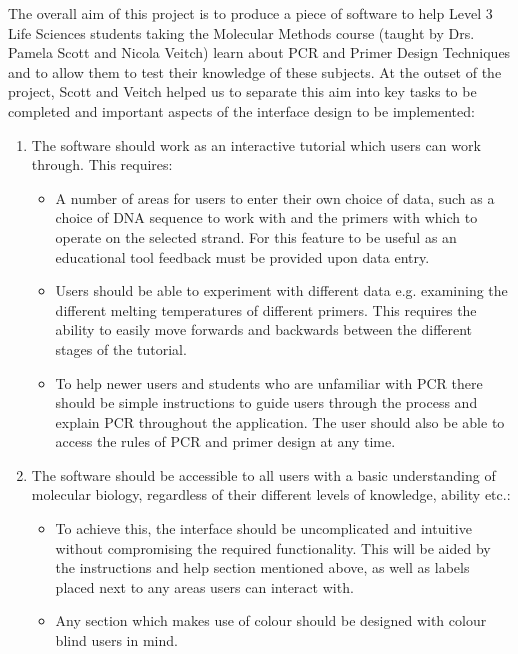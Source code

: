 The overall aim of this project is to produce a piece of software to
help Level 3 Life Sciences students taking the Molecular Methods
course (taught by Drs. Pamela Scott and Nicola Veitch) learn about PCR
and Primer Design Techniques and to allow them to test their knowledge
of these subjects. At the outset of the project, Scott and Veitch
helped us to separate this aim into key tasks to be completed and
important aspects of the interface design to be implemented:

\begin {enumerate}

\item The software should work as an interactive tutorial which users
  can work through. This requires:

\begin {itemize}
\item A number of areas for users to enter their own choice of data,
  such as a choice of DNA sequence to work with and the primers with
  which to operate on the selected strand. For this feature to be
  useful as an educational tool feedback must be provided upon data
  entry.
\item Users should be able to experiment with different data
  e.g. examining the different melting temperatures of different
  primers. This requires the ability to easily move forwards and
  backwards between the different stages of the tutorial.
\item To help newer users and students who are unfamiliar with PCR
  there should be simple instructions to guide users through the
  process and explain PCR throughout the application. The user 
  should also be able to access the rules of PCR and primer design 
  at any time.
\end {itemize}

\item The software should be accessible to all users with a basic
  understanding of molecular biology, regardless of their different
  levels of knowledge, ability etc.:

\begin {itemize}
\item To achieve this, the interface should be uncomplicated and
  intuitive without compromising the required functionality. This will
  be aided by the instructions and help section mentioned above, as
  well as labels placed next to any areas users can interact with.
\item Any section which makes use of colour should be designed with
  colour blind users in mind.
\end {itemize}


\end{enumerate}
